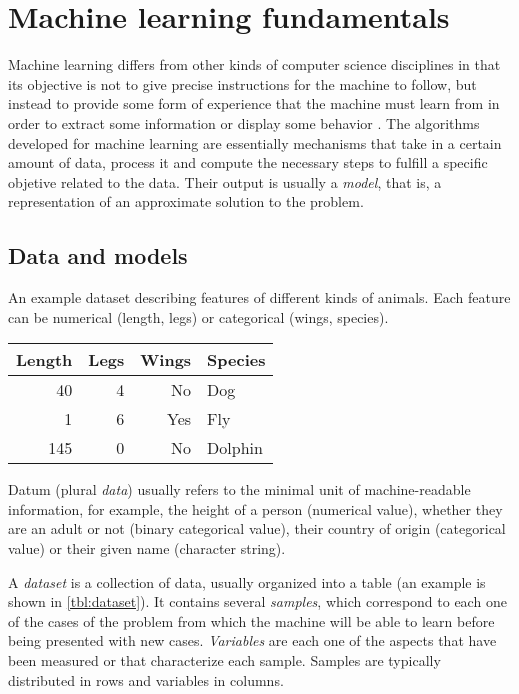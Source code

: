 
\section{Machine learning fundamentals}

Machine learning differs from other kinds of computer science disciplines in that its objective is not to give precise instructions for the machine to follow, but instead to provide some form of experience that the machine must learn from in order to extract some information or display some behavior \cite{deisenroth2020mathematics}. The algorithms developed for machine learning are essentially mechanisms that take in a certain amount of data, process it and compute the necessary steps to fulfill a specific objetive related to the data. Their output is usually a \textit{model}, that is, a representation of an approximate solution to the problem. 
 
\subsection{Data and models}

\begin{margintable}
\caption{\label{tbl:dataset}An example dataset describing features of different kinds of animals. Each feature can be numerical (length, legs) or categorical (wings, species).}\footnotesize
\begin{tabular}{rrrl}\toprule
Length & Legs & Wings & Species\\\midrule
40 & 4 & No & Dog\\
1 & 6 & Yes & Fly\\
145 & 0 & No & Dolphin\\\bottomrule
\end{tabular}
\end{margintable}

Datum (plural \textit{data}) usually refers to the minimal unit of machine-readable information, for example, the height of a person (numerical value), whether they are an adult or not (binary categorical value), their country of origin (categorical value) or their given name (character string).

A \textit{dataset} is a collection of data, usually organized into a table (an example is shown in \autoref{tbl:dataset}). It contains several \textit{samples}, which correspond to each one of the cases of the problem from which the machine will be able to learn before being presented with new cases. \textit{Variables} are each one of the aspects that have been measured or that characterize each sample. Samples are typically distributed in rows and variables in columns.

